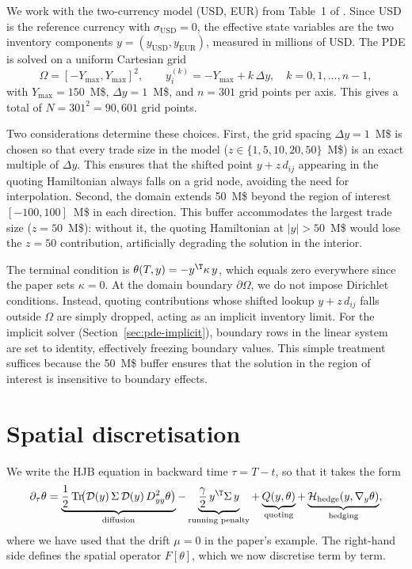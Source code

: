 We work with the two-currency model (USD, EUR) from Table~1 of \cite{barzykin2023}. Since USD is the reference currency with $\sigma_{\text{USD}} = 0$, the effective state variables are the two inventory components $y = (y_{\text{USD}}, y_{\text{EUR}})$, measured in millions of USD. The PDE is solved on a uniform Cartesian grid
\begin{equation}
  \label{eq:grid}
  \Omega = [-Y_{\max}, Y_{\max}]^2, \qquad
  y_i^{(k)} = -Y_{\max} + k\,\Delta y, \quad k = 0, 1, \ldots, n-1,
\end{equation}
with $Y_{\max} = 150$~M\$, $\Delta y = 1$~M\$, and $n = 301$ grid points per axis. This gives a total of $N = 301^2 = 90{,}601$ grid points.

Two considerations determine these choices. First, the grid spacing $\Delta y = 1$~M\$ is chosen so that every trade size in the model ($z \in \{1, 5, 10, 20, 50\}$~M\$) is an exact multiple of $\Delta y$. This ensures that the shifted point $y + z\,d_{ij}$ appearing in the quoting Hamiltonian always falls on a grid node, avoiding the need for interpolation. Second, the domain extends 50~M\$ beyond the region of interest $[-100, 100]$~M\$ in each direction. This buffer accommodates the largest trade size ($z = 50$~M\$): without it, the quoting Hamiltonian at $|y| > 50$~M\$ would lose the $z = 50$ contribution, artificially degrading the solution in the interior.

The terminal condition is $\theta(T, y) = -y^\T \kappa\, y$, which equals zero everywhere since the paper sets $\kappa = 0$. At the domain boundary $\partial\Omega$, we do not impose Dirichlet conditions. Instead, quoting contributions whose shifted lookup $y + z\,d_{ij}$ falls outside $\Omega$ are simply dropped, acting as an implicit inventory limit. For the implicit solver (Section~\ref{sec:pde-implicit}), boundary rows in the linear system are set to identity, effectively freezing boundary values. This simple treatment suffices because the 50~M\$ buffer ensures that the solution in the region of interest is insensitive to boundary effects.


\section{Spatial discretisation}
\label{sec:pde-spatial}

We write the HJB equation in backward time $\tau = T - t$, so that it takes the form
\begin{equation}
  \label{eq:hjb-backward}
  \partial_\tau \theta = \underbrace{\frac{1}{2}\operatorname{Tr}\!\bigl(\mathcal{D}(y)\,\Sigma\,\mathcal{D}(y)\,D^2_{yy}\theta\bigr)}_{\text{diffusion}}
  - \underbrace{\frac{\gamma}{2}\,y^\T \Sigma\, y}_{\text{running penalty}}
  + \underbrace{Q(y, \theta)}_{\text{quoting}}
  + \underbrace{\mathcal{H}_{\text{hedge}}(y, \nabla_y\theta)}_{\text{hedging}},
\end{equation}
where we have used that the drift $\mu = 0$ in the paper's example. The right-hand side defines the spatial operator $F[\theta]$, which we now discretise term by term.


